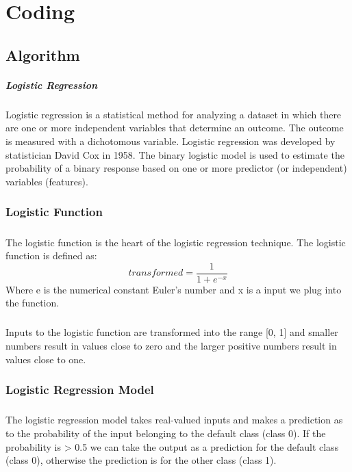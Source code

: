 \chapter{Coding}


\section{Algorithm}
\paragraph{Logistic Regression}
Logistic regression is a statistical method for analyzing a dataset in which there are one or more independent variables that determine an outcome. The outcome is measured with a dichotomous variable. Logistic regression was developed by statistician David Cox in 1958. The binary logistic model is used to estimate the probability of a binary response based on one or more predictor (or independent) variables (features).

\subsection{Logistic Function}
\paragraph{}
The logistic function is the heart of the logistic regression technique. The logistic function is defined as:
\begin{equation}
transformed = \frac{1}{1+e^{-x}}
\end{equation}
Where e is the numerical constant Euler’s number and x is a input we plug into the function.
\paragraph{}
Inputs to the logistic function are transformed into the range [0, 1] and smaller numbers result in values close to zero and the larger positive numbers result in values close to one.
\subsection{Logistic Regression Model}
\paragraph{}
The logistic regression model takes real-valued inputs and makes a prediction as to the probability of the input belonging to the default class (class 0). If the probability is > 0.5 we can take the output as a prediction for the default class (class 0), otherwise the prediction is for the other class (class 1).
